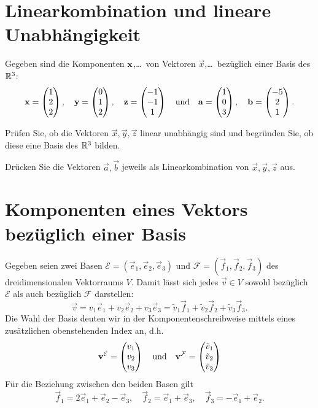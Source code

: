 \documentclass{scrartcl}
\newcommand{\ee}{\vec{e}}
\newcommand{\ff}{\vec{f}}
\begin{document}
\section{Linearkombination und lineare Unabhängigkeit}
Gegeben sind die Komponenten $\mathbf{x}$,\ldots\ von Vektoren $\vec{x}$,\ldots\ bezüglich einer Basis des $\mathbb{R}^3$:
\[
  \mathbf{x} = \begin{pmatrix} 1 \\ 2 \\ 2 \end{pmatrix}, \quad
  \mathbf{y} = \begin{pmatrix} 0 \\ 1 \\ 2 \end{pmatrix}, \quad
  \mathbf{z} = \begin{pmatrix} -1 \\ -1 \\ 1 \end{pmatrix} \quad \textrm{und} \quad
  \mathbf{a} = \begin{pmatrix} 1 \\ 0 \\ 3 \end{pmatrix}, \quad
  \mathbf{b} = \begin{pmatrix} -5 \\ 2 \\ 1 \end{pmatrix}.
\]
\begin{subex}
   \item Prüfen Sie, ob die Vektoren $\vec{x} , \vec{y} , \vec{z}$ linear unabhängig sind und begründen Sie, ob diese eine Basis des $\mathbb{R}^3$ bilden.
   \item Drücken Sie die Vektoren $\vec{a}, \vec{b}$ jeweils als Linearkombination von $\vec{x} , \vec{y} , \vec{z}$ aus.
 \end{subex}



\section{Komponenten eines Vektors bezüglich einer Basis}
Gegeben seien zwei Basen $\mathcal{E} = (\ee_1, \ee_2, \ee_3)$ und $\mathcal{F} = (\ff_1,\ff_2,\ff_3)$ des dreidimensionalen Vektorraums $V$.
Damit lässt sich jedes $\vec{v} \in V$ sowohl bezüglich $\mathcal{E}$ als auch bezüglich $\mathcal{F}$ darstellen:
\[
  \label{eq:basis}\tag{+}  
  \vec{v} = v_1 \ee_1 + v_2 \ee_2 + v_3 \ee_3 = \tilde{v}_1 \ff_1 + \tilde{v}_2 \ff_2 + \tilde{v}_3 \ff_3.
\]
Die Wahl der Basis deuten wir in der Komponentenschreibweise mittels eines zusätzlichen obenstehenden Index an, d.h.
\[
  \mathbf{v}^\mathcal{E} = \begin{pmatrix}v_1 \\ v_2 \\ v_3\end{pmatrix} \quad\mbox{und}\quad
  \mathbf{v}^\mathcal{F} = \begin{pmatrix}\tilde{v}_1 \\ \tilde{v}_2 \\ \tilde{v}_3\end{pmatrix} 
\]
Für die Beziehung zwischen den beiden Basen gilt
\[
  \ff_1 = 2 \ee_1 + \ee_2 - \ee_3, \quad 
  \ff_2 = \ee_1 + \ee_3, \quad
  \ff_3 = -\ee_1 + \ee_2.
\]
\end{document}
